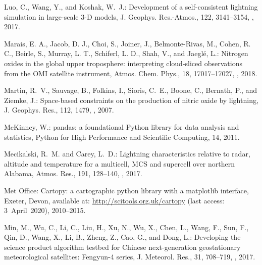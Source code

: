 \documentclass[amt]{copernicus}
\begin{document}
\begin{thebibliography}{105}
Luo, C., Wang, Y., and Koshak, W.~J.: Development of a self-consistent
  lightning  simulation in large-scale 3-D models, J. Geophys. Res.-Atmos., 122, 3141--3154, , 2017.

Marais, E. A., Jacob, D. J., Choi, S., Joiner, J., Belmonte-Rivas, M., Cohen, R. C., Beirle, S., Murray, L. T., Schiferl, L. D., Shah, V., and Jaeglé, L.: Nitrogen oxides in the global upper troposphere: interpreting cloud-sliced  observations from the OMI satellite instrument, Atmos. Chem. Phys., 18, 17017–17027, , 2018.


Martin, R.~V., Sauvage, B., Folkins, I., Sioris, C.~E., Boone, C., Bernath, P.,
  and Ziemke, J.: Space-based constraints on the production of nitric oxide by
  lightning, J. Geophys. Res., 112, 1479,
  , 2007.

McKinney, W.: pandas: a foundational Python library for data analysis and
  statistics, Python for High Performance and Scientific Computing, 14, 2011.

Mecikalski, R.~M. and Carey, L.~D.: Lightning characteristics relative to
  radar, altitude and temperature for a multicell, MCS and supercell over
  northern Alabama, Atmos. Res., 191, 128--140,
  ,
  2017.

{Met Office}: Cartopy: a cartographic python library with a matplotlib
  interface, Exeter, Devon, available at: \url{http://scitools.org.uk/cartopy} (last access: 3~April~2020),
  2010--2015.

Min, M., Wu, C., Li, C., Liu, H., Xu, N., Wu, X., Chen, L., Wang, F., Sun, F.,
  Qin, D., Wang, X., Li, B., Zheng, Z., Cao, G., and Dong, L.: Developing the
  science product algorithm testbed for Chinese next-generation geostationary
  meteorological satellites: Fengyun-4 series, J. Meteorol.
  Res., 31, 708--719, , 2017.


\end{thebibliography}
\end{document}

